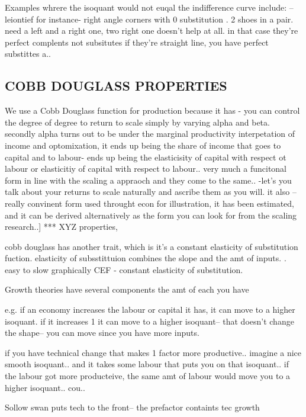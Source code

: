 Examples whrere the isoquant would not euqal the indifference curve include: -- leiontief for instance- right angle corners with 0 substitution . 2 shoes in a pair. need a left and a right one, two right one doesn't help at all. in that case they're perfect complents not subsitutes
if they're straight line, you have perfect substittes a.. 




\subsection{COBB DOUGLASS PROPERTIES}

We use a Cobb Douglass function for production because it has - you can control the degree of degree to return to scale simply by varying alpha and beta. secondly alpha turns out to be under the marginal productivity interpetation of income and optomixation, it ends up being the share of income that goes to capital and to labour- ends up being the elasticisity of capital with respect ot labour or elasticitiy of capital with respect to labour.. very much a funcitonal form in line with the scaling a appraoch and they come to the same.. -let's you talk about your returns to scale naturally and ascribe them as you will. it also -- really convinent form used throught econ for illustration, it has been estimated, and it can be derived alternatively as the form you can look for from the scaling research..]
*** XYZ properties,

cobb douglass has another trait, which is it's a constant elasticity of substitution fuction.
elasticity of subsstittuion combines the slope and the amt of inputs. . easy to slow graphically CEF - constant elasticity of substitution.




Growth theories have several components
the amt of each you have

e.g. if an economy increases the labour or capital it has, it can move to a higher isoquant. if it increases 1 it can move to a higher isoquant-- that doesn't change the shape-- you can move since you have more inputs.

if you have technical change that makes 1 factor more productive.. imagine a nice smooth isoquant.. and it takes some labour that puts you on that isoquant.. if the labour got more producteive, the same amt of labour would move you to a higher isoquant.. cou..


Sollow swan puts tech to the front-- the prefactor containts tec growth

